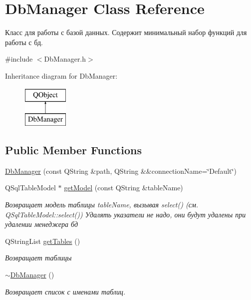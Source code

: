 \hypertarget{class_db_manager}{}\section{Db\+Manager Class Reference}
\label{class_db_manager}


Класс для работы с базой данных. Содержит минимальный набор функций для работы с бд.  




{\ttfamily \#include $<$Db\+Manager.\+h$>$}

Inheritance diagram for Db\+Manager\+:\begin{figure}[H]
\begin{center}
\leavevmode
\includegraphics[height=2.000000cm]{class_db_manager}
\end{center}
\end{figure}
\subsection*{Public Member Functions}
\begin{DoxyCompactItemize}
\item 
\hyperlink{class_db_manager_acae386f0fc2af5d3f3b5c2adc5226391}{Db\+Manager} (const Q\+String \&path, Q\+String \&\&connection\+Name=\char`\"{}Default\char`\"{})
\item 
Q\+Sql\+Table\+Model $\ast$ \hyperlink{class_db_manager_a4b9a7828f0d6e53b695da5168570653c}{get\+Model} (const Q\+String \&table\+Name)
\begin{DoxyCompactList}\small\item\em Возвращает модель таблицы table\+Name, вызывая select() (см. Q\+Sql\+Table\+Model\+::select()) Удалять указатели не надо, они будут удалены при удалении менеджера бд \end{DoxyCompactList}\item 
Q\+String\+List \hyperlink{class_db_manager_a56efe9d49dc68dcdef05ae834f7618b0}{get\+Tables} ()
\begin{DoxyCompactList}\small\item\em Возвращает таблицы \end{DoxyCompactList}\item 
\mbox{\label{class_db_manager_ac5cdf8e5e932d1681ab807d8f256374c}} 
\hyperlink{class_db_manager_ac5cdf8e5e932d1681ab807d8f256374c}{$\sim$\+Db\+Manager} ()
\begin{DoxyCompactList}\small\item\em Возвращает список с именами таблиц. \end{DoxyCompactList}\end{DoxyCompactItemize}
